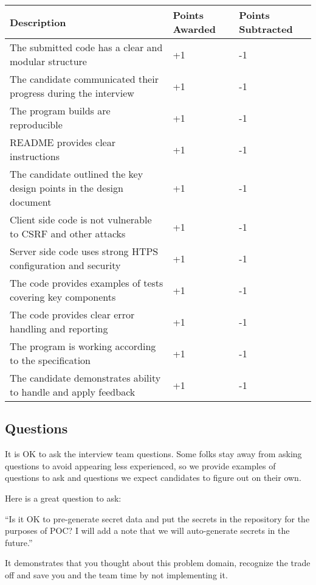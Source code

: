 \documentclass{article}
\begin{document}
\begin{center}
\begin{tabular}{ | m{25em} | m{5em}| m{5em} | }
  \hline
  \rowcolor{blue!60!black!10}
  Description & Points Awarded & Points Subtracted \\
  \hline
  The submitted code has a clear and modular structure & +1 & -1 \\
  \hline
  The candidate communicated their progress during the interview & +1 & -1 \\
  \hline
  The program builds are reproducible & +1 & -1 \\
  \hline
  README provides clear instructions & +1 & -1 \\
  \hline
  The candidate outlined the key design points in the design document & +1 & -1 \\
  \hline
  Client side code is not vulnerable to CSRF and other attacks & +1 & -1 \\
  \hline
  Server side code uses strong HTPS configuration and security & +1 & -1 \\
  \hline
  The code provides examples of tests covering key components & +1 & -1 \\
  \hline
  The code provides clear error handling and reporting & +1 & -1 \\
  \hline
  The program is working according to the specification & +1 & -1 \\
  \hline
  The candidate demonstrates ability to handle and apply feedback & +1 & -1 \\
  \hline
\end{tabular}
\end{center}

\subsection{Questions}

It is OK to ask the interview team questions. Some folks stay away from
asking questions to avoid appearing less experienced, so we provide examples of questions
to ask and questions we expect candidates to figure out on their own.

Here is a great question to ask:

``Is it OK to pre-generate secret data and put the secrets in the repository for the purposes of POC? I will add a note that we will auto-generate secrets in the future.''

It demonstrates that you thought about this problem domain, recognize the trade off and save you and the team time by not implementing it.
\end{document}
